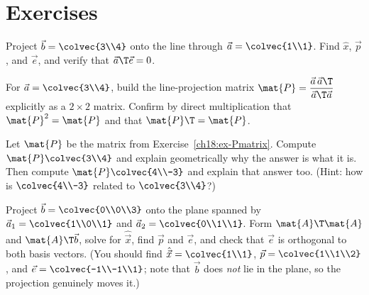 \section{Exercises}

\begin{exercise}\label{ch18:ex-line-basic}
Project $\vec{b}=\colvec{3\\4}$ onto the line through $\vec{a}=\colvec{1\\1}$. Find $\hat{x}$,
$\vec{p}$, and $\vec{e}$, and verify that $\vec{a}\T\vec{e}=0$.
\end{exercise}

\begin{exercise}\label{ch18:ex-Pmatrix}
For $\vec{a}=\colvec{3\\4}$, build the line-projection matrix
$\mat{P}=\dfrac{\vec{a}\,\vec{a}\T}{\vec{a}\T\vec{a}}$ explicitly as a $2\times2$ matrix. Confirm by
direct multiplication that $\mat{P}^2=\mat{P}$ and that $\mat{P}\T=\mat{P}$.
\end{exercise}

\begin{exercise}\label{ch18:ex-already-in}
Let $\mat{P}$ be the matrix from Exercise~\ref{ch18:ex-Pmatrix}. Compute $\mat{P}\colvec{3\\4}$ and
explain geometrically why the answer is what it is. Then compute $\mat{P}\colvec{4\\-3}$ and explain
that answer too. (Hint: how is $\colvec{4\\-3}$ related to $\colvec{3\\4}$?)
\end{exercise}

\begin{exercise}\label{ch18:ex-plane}
Project $\vec{b}=\colvec{0\\0\\3}$ onto the plane spanned by $\vec{a}_1=\colvec{1\\0\\1}$ and
$\vec{a}_2=\colvec{0\\1\\1}$. Form $\mat{A}\T\mat{A}$ and $\mat{A}\T\vec{b}$, solve for
$\hat{\vec{x}}$, find $\vec{p}$ and $\vec{e}$, and check that $\vec{e}$ is orthogonal to both basis
vectors. (You should find $\hat{\vec{x}}=\colvec{1\\1}$, $\vec{p}=\colvec{1\\1\\2}$, and
$\vec{e}=\colvec{-1\\-1\\1}$; note that $\vec{b}$ does \emph{not} lie in the plane, so the projection
genuinely moves it.)
\end{exercise}

